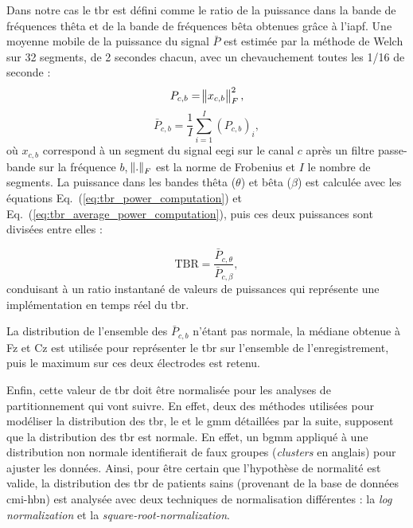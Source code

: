 Dans notre cas le \gls{tbr} est défini comme le ratio de la puissance dans la bande de fréquences thêta et de la bande de fréquences bêta obtenues 
grâce à l'\gls{iapf}. Une moyenne mobile de la puissance du signal $\bar{P}$ est estimée par la méthode de Welch \citep{Welch1967} sur 32 segments, de 2 secondes chacun, avec un 
chevauchement toutes les 1/16 de seconde :
\begin{equation}
\label{eq:tbr_power_computation}
P_{c,b} = \norm{ x_{c,b} }_{F}^2,
\end{equation}
\begin{equation}
\label{eq:tbr_average_power_computation}
\bar{P}_{c,b} = \frac{1}{I} \sum_{i=1}^{I} (P_{c,b})_{i},
\end{equation}
où $x_{c,b}$ correspond à un segment du signal \gls{eegi} sur le canal $c$ après un filtre passe-bande sur la fréquence $b$, $\norm{.}_{F}$ est la norme de Frobenius et $I$ 
le nombre de segments. La puissance dans les bandes thêta ($\theta$) et bêta ($\beta$) est calculée avec les équations Eq.~(\ref{eq:tbr_power_computation}) et Eq.~(\ref{eq:tbr_average_power_computation}),
puis ces deux puissances sont divisées entre elles :

\begin{equation}
\label{eq:tbr_tbr_computation}
\text{TBR} = \frac{\bar{P}_{c,\theta}}{\bar{P}_{c,\beta}},
\end{equation}
conduisant à un ratio instantané de valeurs de puissances qui représente une implémentation en temps réel du \gls{tbr}.

La distribution de l'ensemble des $\bar{P}_{c,b}$ n'étant pas normale, la médiane obtenue à Fz et Cz est utilisée pour représenter le \gls{tbr} sur l'ensemble 
de l'enregistrement, puis le maximum sur ces deux électrodes est retenu.

Enfin, cette valeur de \gls{tbr} doit être normalisée pour les analyses de partitionnement qui vont suivre. En effet, deux des méthodes utilisées pour modéliser la distribution des \gls{tbr},
le  et le \gls{gmm} détaillées par la suite, supposent que la distribution des \gls{tbr} est normale. 
En effet, un \gls{bgmm} appliqué à une distribution non normale identifierait de faux groupes (\textit{clusters} en anglais) pour ajuster les données. 
Ainsi, pour être certain que l'hypothèse de normalité est valide, la distribution des \gls{tbr} de patients sains (provenant de la base de données \gls{cmi-hbn})
est analysée avec deux techniques de normalisation différentes : la \textit{log normalization} et la \textit{square-root-normalization}.

